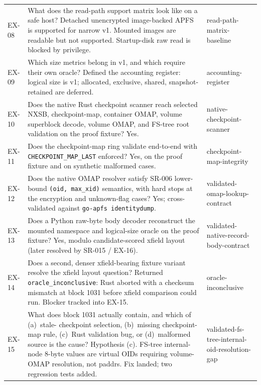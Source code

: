 \begin{longtable}{p{}p{}p{}}
EX-08 &
What does the read-path support matrix look like on a safe host?
Detached unencrypted image-backed APFS is supported for narrow v1.
Mounted images are readable but not supported. Startup-disk raw read
is blocked by privilege.
& read-path-matrix-baseline \\

EX-09 &
Which size metrics belong in v1, and which require their own
oracle? Defined the accounting register: logical size is v1;
allocated, exclusive, shared, snapshot-retained are deferred.
& accounting-register \\

EX-10 &
Does the native Rust checkpoint scanner reach selected NXSB,
checkpoint-map, container OMAP, volume superblock decode, volume
OMAP, and FS-tree root validation on the proof fixture? Yes.
& native-checkpoint-scanner \\

EX-11 &
Does the checkpoint-map ring validate end-to-end with
\texttt{CHECKPOINT\_MAP\_LAST} enforced? Yes, on the proof fixture
and on synthetic malformed cases.
& checkpoint-map-integrity \\

EX-12 &
Does the native OMAP resolver satisfy SR-006 lower-bound
\texttt{(oid, max\_xid)} semantics, with hard stops at the encryption
and unknown-flag cases? Yes; cross-validated against
\texttt{go-apfs identitydump}.
& validated-omap-lookup-contract \\

EX-13 &
Does a Python raw-byte body decoder reconstruct the mounted namespace
and logical-size oracle on the proof fixture? Yes, modulo
candidate-scored xfield layout (later resolved by SR-015 / EX-16).
& validated-native-record-body-contract \\

EX-14 &
Does a second, denser xfield-bearing fixture variant resolve the
xfield layout question? Returned \texttt{oracle\_inconclusive}: Rust
aborted with a checksum mismatch at block 1031 before xfield
comparison could run. Blocker tracked into EX-15.
& oracle-inconclusive \\

EX-15 &
What does block 1031 actually contain, and which of (a)~stale-
checkpoint selection, (b)~missing checkpoint-map rule, (c)~Rust
validation bug, or (d)~malformed source is the cause? Hypothesis
(c). FS-tree internal-node 8-byte values are virtual OIDs requiring
volume-OMAP resolution, not paddrs. Fix landed; two regression tests
added.
& validated-fs-tree-internal-oid-resolution-gap \\


\end{longtable}
